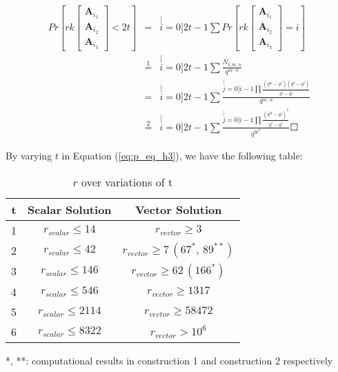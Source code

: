 \begin{eqnarray}
Pr\left[rk\left[\begin{array}{c}
\boldsymbol{A}_{i_{1}}\\
\boldsymbol{A}_{i_{2}}\\
\boldsymbol{A}_{i_{3}}
\end{array}\right]<2t\right] & = & \stackrel[i=0]{2t-1}{\mathop{\sum}}Pr\left[rk\left[\begin{array}{c}
\boldsymbol{A}_{i_{1}}\\
\boldsymbol{A}_{i_{2}}\\
\boldsymbol{A}_{i_{3}}
\end{array}\right]=i\right]\nonumber \\
 & \overset{1}{=} & \stackrel[i=0]{2t-1}{\mathop{\sum}}\frac{N_{t,m,n}}{q^{m\cdot n}}\nonumber \\
 & = & \stackrel[i=0]{2t-1}{\mathop{\sum}}\frac{\stackrel[j=0]{i-1}{\mathop{\prod}}\frac{\left(q^{m}-q^{j}\right)\left(q^{n}-q^{j}\right)}{q^{i}-q^{j}}}{q^{m\cdot n}}\nonumber \\
 & \overset{2}{=} & \stackrel[i=0]{2t-1}{\mathop{\sum}}\frac{\stackrel[j=0]{i-1}{\mathop{\prod}}\frac{\left(q^{3t}-q^{j}\right)^{2}}{q^{i}-q^{j}}}{q^{9t^{2}}}\Square\label{eq:p_eq_h3}
\end{eqnarray}

By varying $t$ in Equation (\ref{eq:p_eq_h3}), we have the following
table:

\begin{table}[H]
\caption{$r$ over variations of t\label{tab:r_over_t}}

\begin{tabular}{|c|c|c|}
\hline 
t & Scalar Solution & Vector Solution\tabularnewline
\hline 
\hline 
1 & $r_{scalar}\leq14$ & $r_{vector}\geq3$\tabularnewline
\hline 
2 & $r_{scalar}\leq42$ & $r_{vector}\geq7\,\left(67^{*},\,89^{**}\right)$\tabularnewline
\hline 
3 & $r_{scalar}\leq146$ & $r_{vector}\geq62\,\left(166^{*}\right)$ \tabularnewline
\hline 
4 & $r_{scalar}\leq546$ & $r_{vector}\geq1317$\tabularnewline
\hline 
5 & $r_{scalar}\leq2114$ & $r_{vector}\geq58472$\tabularnewline
\hline 
6 & $r_{scalar}\leq8322$ & $r_{vector}>10^{6}$\tabularnewline
\hline 
\end{tabular}

{*}, {*}{*}: computational results in construction 1 and construction
2 respectively
\end{table}

